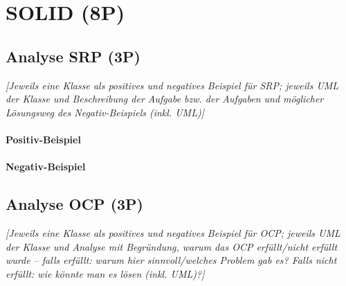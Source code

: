 
\titlespacing*{\chapter}{0pt}{-30mm}{10pt}
  
\chapter{SOLID (8P)}
\pagestyle{scrheadings}
\clearscrheadfoot
{}
\setcounter{page}{3}
\ofoot[\pagemark]{\pagemark}
\onehalfspacing

\section{Analyse SRP (3P)}
\emph{[Jeweils eine Klasse als positives und negatives Beispiel für SRP; jeweils UML der Klasse und
Beschreibung der Aufgabe bzw. der Aufgaben und möglicher Lösungsweg des Negativ-Beispiels (inkl.
UML)]}

\subsubsection{Positiv-Beispiel}
\subsubsection{Negativ-Beispiel}

\section{Analyse OCP (3P)}
\emph{[Jeweils eine Klasse als positives und negatives Beispiel für OCP; jeweils UML der Klasse und
Analyse mit Begründung, warum das OCP erfüllt/nicht erfüllt wurde – falls erfüllt: warum hier
sinnvoll/welches Problem gab es? Falls nicht erfüllt: wie könnte man es lösen (inkl. UML)?]}

